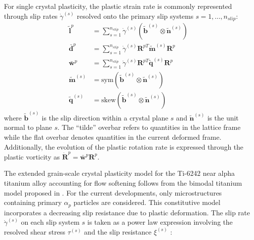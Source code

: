 \documentclass[review]{elsarticle}
\begin{document}
	For single crystal plasticity, the plastic strain rate is commonly represented through slip rates $\dot{\gamma}^{(s)}$ resolved onto the primary slip systems $s=1, \ldots, n_{slip}$:
	\begin{align}
	\mathbf{\tilde{l}}^p &= \sum_{s=1}^{n_{slip}}\dot{\gamma}^{(s)} \left(\mathbf{\tilde{b}}^{(s)} \otimes \mathbf{\tilde{n}}^{(s)}\right) \\
	\bar{\mathbf{d}}^p &= \sum_{s=1}^{n_{slip}} \dot{\gamma}^{(s)} \mathbf{R}^{pT}\tilde{\mathbf{m}}^{(s)}\mathbf{R}^p \\
	\bar{\mathbf{w}}^p &= \sum_{s=1}^{n_{slip}} \dot{\gamma}^{(s)} \mathbf{R}^{pT}\tilde{\mathbf{q}}^{(s)}\mathbf{R}^p \\
	\tilde{\mathbf{m}}^{(s)} &= \text{sym} \left( \tilde{\mathbf{b}}^{(s)} \otimes \tilde{\mathbf{n}}^{(s)} \right) \\
	\tilde{\mathbf{q}}^{(s)} &= \text{skew} \left( \tilde{\mathbf{b}}^{(s)} \otimes \tilde{\mathbf{n}}^{(s)} \right)
	\end{align}
	where $\tilde{\mathbf{b}}^{(s)}$ is the slip direction within a crystal plane $s$ and $\tilde{\mathbf{n}}^{(s)}$ is the unit normal to plane $s$.
    The ``tilde'' overbar refers to quantities in the lattice frame while the flat overbar denotes quantities in the current deformed frame.
    Additionally, the evolution of the plastic rotation rate is expressed through the plastic vorticity as $\dot{\mathbf{R}}^p = \bar{\mathbf{w}}^p \mathbf{R}^p$.
	
	The extended grain-scale crystal plasticity model for the Ti-6242 near alpha titanium alloy accounting for flow softening follows from the bimodal titanium model proposed in \cite{r18}.
	For the current developments, only microstructures containing primary $\alpha_p$ particles are considered.
	This constitutive model incorporates a decreasing slip resistance due to plastic deformation.
	The slip rate $\dot{\gamma}^{(s)}$ on each slip system $s$ is taken as a power law expression involving the resolved shear stress $\tau^{(s)}$ and the slip resistance $\xi^{(s)}$ :
	
\end{document}
